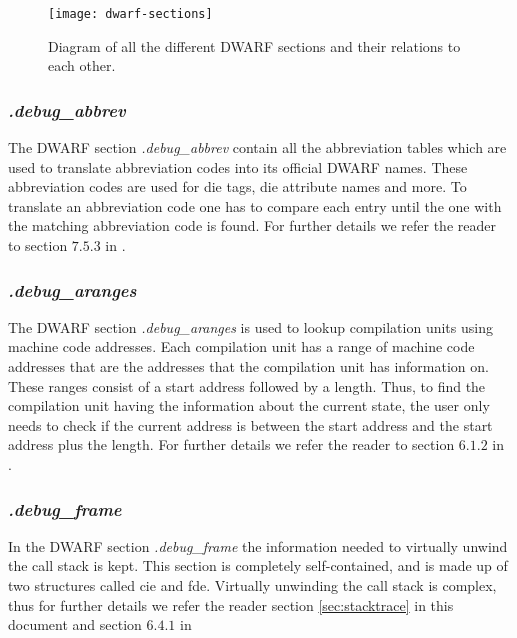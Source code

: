 

\begin{figure}[h]
	\centering
	\texttt{[image: dwarf-sections]}
	\caption{Diagram of all the different \gls{DWARF} sections and their relations to each other.}
	\label{fig:dwarfsections}
\end{figure}


\subsubsection{\emph{.debug\_abbrev}}
The \gls{DWARF} section \emph{.debug\_abbrev} contain all the abbreviation tables which are used to translate abbreviation codes into its official \gls{DWARF} names.
These abbreviation codes are used for \gls{die} tags, \gls{die} attribute names and more.
To translate an abbreviation code one has to compare each entry until the one with the matching abbreviation code is found.
For further details we refer the reader to section $7.5.3$ in \cite{dwarf}.


\subsubsection{\emph{.debug\_aranges}}
The \gls{DWARF} section \emph{.debug\_aranges} is used to lookup compilation units using machine code addresses.
Each compilation unit has a range of machine code addresses that are the addresses that the compilation unit has information on.
These ranges consist of a start address followed by a length.
Thus, to find the compilation unit having the information about the current state, the user only needs to check if the current address is between the start address and the start address plus the length.
For further details we refer the reader to section $6.1.2$ in \cite{dwarf}.


\subsubsection{\emph{.debug\_frame}}
In the \gls{DWARF} section \emph{.debug\_frame} the information needed to virtually unwind the call stack is kept.
This section is completely self-contained, and is made up of two structures called \acrfull{cie} and \acrfull{fde}.
Virtually unwinding the call stack is complex, thus for further details we refer the reader section \ref{sec:stacktrace} in this document and section $6.4.1$ in \cite{dwarf}


